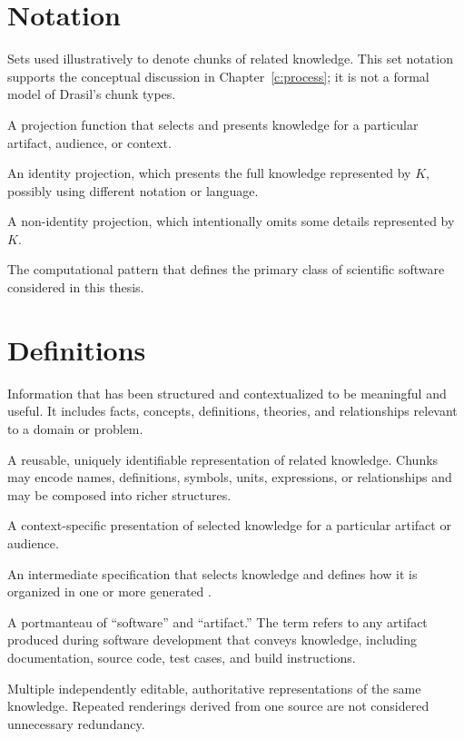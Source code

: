 
\section*{Notation}
\begin{description}[font=\rmfamily\bfseries, leftmargin=3cm, style=nextline]
    \item[$K$, $L$, $M$] Sets used illustratively to denote chunks of related
    knowledge. This set notation supports the conceptual discussion in
    Chapter~\ref{c:process}; it is not a formal model of Drasil's chunk types.
    \item[$p(\cdot)$] A projection function that selects and presents knowledge
    for a particular artifact, audience, or context.
    \item[$p(K) \equiv K$] An identity projection, which presents the full
    knowledge represented by $K$, possibly using different notation or
    language.
    \item[$p(K) \subset K$] A non-identity projection, which intentionally
    omits some details represented by $K$.
    \item[\mbox{\emph{input~$\rightarrow$~process~$\rightarrow$~output}}] The 
    computational pattern that defines the primary class
    of scientific software considered in this thesis.
\end{description}

\section*{Definitions}
\begin{description}[font=\rmfamily\bfseries, leftmargin=3cm, style=nextline]
    \item[Knowledge] Information that has been structured and contextualized
    to be meaningful and useful. It includes facts, concepts, definitions,
    theories, and relationships relevant to a domain or problem.
    \item[Knowledge chunk] A reusable, uniquely identifiable representation of
    related knowledge. Chunks may encode names, definitions, symbols, units,
    expressions, or relationships and may be composed into richer structures.
    \item[Knowledge projection] A context-specific presentation of selected
    knowledge for a particular artifact or audience.
    \item[Recipe] An intermediate specification that selects knowledge and
    defines how it is organized in one or more generated \sfs{}.
    \item[\SF] A portmanteau of ``software'' and ``artifact.'' The term refers
    to any artifact produced during software development that conveys
    knowledge, including documentation, source code, test cases, and build
    instructions.
    \item[Unnecessary redundancy] Multiple independently editable,
    authoritative representations of the same knowledge. Repeated renderings
    derived from one source are not considered unnecessary redundancy.
\end{description}

